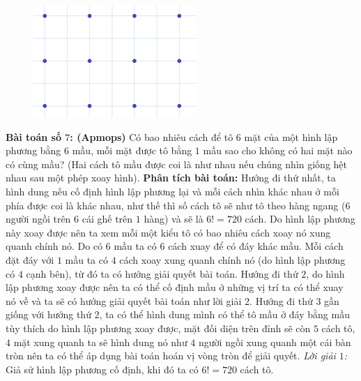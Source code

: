 \begin{multicols}{2}
\begin{figure}[H]
			\centering
			\vspace*{-5pt}
			\captionsetup{labelformat=empty, justification=centering}
			\includegraphics[width=0.75\linewidth]{_12}
			\vspace*{-5pt}
		\end{figure}
	\textbf{\color{toancuabi}Bài toán số $7$: (Apmops)}
	\vskip 0.1cm
	Có bao nhiêu cách để tô $6$ mặt của một hình lập phương bằng $6$ mầu, mỗi mặt được tô bằng $1$ mầu sao cho không có hai mặt nào có cùng mầu? (Hai cách tô mầu được coi là như nhau nếu chúng nhìn giống hệt nhau sau một phép xoay hình). 
	\vskip 0.1cm
	\textbf{\color{toancuabi}Phân tích bài toán:} Hướng đi thứ nhất, ta hình dung nếu cố định hình lập phương lại và mỗi cách nhìn khác nhau ở mỗi phía được coi là khác nhau, như thế thì số cách tô sẽ như tô theo hàng ngang ($6$ người ngồi trên $6$ cái ghế trên $1$ hàng) và sẽ là $6!=720$ cách. Do hình lập phương này xoay được nên ta xem mỗi một kiểu tô có bao nhiêu cách xoay nó xung quanh chính nó. Do có $6$ mầu ta có $6$ cách xuay để có đáy khác mầu. Mỗi cách đặt đáy với $1$ mầu ta có $4$ cách xoay xung quanh chính nó (do hình lập phương có $4$ cạnh bên), từ đó ta có hướng giải quyết bài toán.
	\vskip 0.1cm
	Hướng đi thứ $2$, do hình lập phương xoay được nên ta có thể cố định mầu ở những vị trí ta có thể xuay nó về và ta sẽ có hướng giải quyết bài toán như lời giải $2$.
	\vskip 0.1cm
	Hướng đi thứ $3$ gần giống với hướng thứ $2$, ta có thể hình dung mình có thể tô mầu ở đáy bằng mầu tùy thích do hình lập phương xoay được, mặt đối diện trên đỉnh sẽ còn $5$ cách tô, $4$ mặt xung quanh ta sẽ hình dung nó như $4$ người ngồi xung quanh một cái bàn tròn nên ta có thể áp dụng bài toán hoán vị vòng tròn để giải quyết.
	\vskip 0.1cm
	\textit{Lời giải $1$:}
	\vskip 0.1cm 
	Giả sử hình lập phương cố định, khi đó ta có $6!=720$ cách tô.

\end{multicols}
